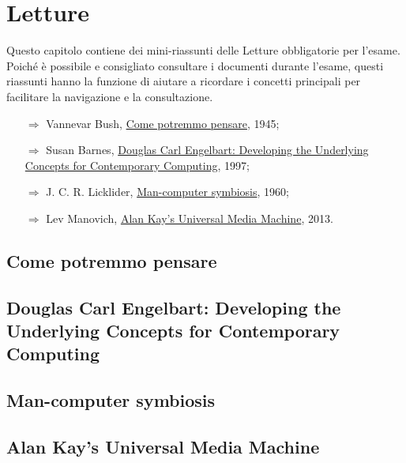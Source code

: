 \chapter{Letture}

Questo capitolo contiene dei mini-riassunti delle Letture
obbligatorie per l'esame. Poiché è possibile e consigliato consultare
i documenti durante l'esame, questi riassunti hanno la funzione di 
aiutare a ricordare i concetti principali per facilitare la navigazione 
e la consultazione.

\begin{itemize}
    \item [$\Rightarrow$] Vannevar Bush, \href{https://informatica.i-learn.unito.it/pluginfile.php/368484/mod_resource/content/7/Bush%20%281945%29.pdf}{Come potremmo pensare}, 1945;
    \item [$\Rightarrow$] Susan Barnes, \href{https://informatica.i-learn.unito.it/pluginfile.php/368474/mod_resource/content/2/Barnes%2C%20S.B.%20--%20Douglas%20Carl%20Engelbart-%20developing%20the%20underlying%20concepts%20for%20contemporary%20computing.pdf}{Douglas Carl Engelbart: Developing the Underlying Concepts for Contemporary Computing}, 1997;
    \item [$\Rightarrow$] J. C. R. Licklider, \href{https://informatica.i-learn.unito.it/pluginfile.php/368452/mod_resource/content/2/Licklider%20-%20Man-Computer%20Symbiosis.pdf}{Man-computer symbiosis}, 1960;
    \item [$\Rightarrow$] Lev Manovich, \href{https://informatica.i-learn.unito.it/pluginfile.php/368438/mod_resource/content/1/Lev%20Manovich-Software_Takes_Command-Ch1.pdf}{Alan Kay's Universal Media Machine}, 2013.
\end{itemize}

\section{Come potremmo pensare}

\section{Douglas Carl Engelbart: Developing the Underlying Concepts for Contemporary Computing}

\section{Man-computer symbiosis}

\section{Alan Kay's Universal Media Machine}